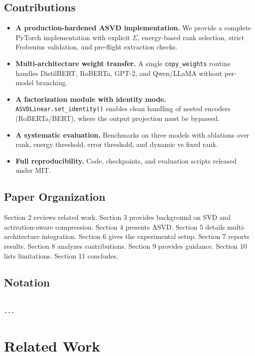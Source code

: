 \subsection{Contributions}

\begin{itemize}
\item \textbf{A production-hardened ASVD implementation.} We provide a complete
  PyTorch implementation with explicit $\Sigma$, energy-based rank selection,
  strict Frobenius validation, and pre-flight extraction checks.
\item \textbf{Multi-architecture weight transfer.} A single \texttt{copy\_weights} routine
  handles DistilBERT, RoBERTa, GPT-2, and Qwen/LLaMA without per-model
  branching.
\item \textbf{A factorization module with identity mode.} \texttt{ASVDLinear.set\_identity()}
  enables clean handling of nested encoders (RoBERTa/BERT), where the output
  projection must be bypassed.
\item \textbf{A systematic evaluation.} Benchmarks on three models with ablations
  over rank, energy threshold, error threshold, and dynamic vs fixed rank.
\item \textbf{Full reproducibility.} Code, checkpoints, and evaluation scripts
  released under MIT.

\end{itemize}
\subsection{Paper Organization}

Section 2 reviews related work. Section 3 provides background on SVD and 
activation-aware compression. Section 4 presents ASVD. Section 5 details 
multi-architecture integration. Section 6 gives the experimental setup. 
Section 7 reports results. Section 8 analyzes contributions. Section 9 
provides guidance. Section 10 lists limitations. Section 11 concludes.



\subsection{Notation}

\begin{lstlisting}

---
\end{lstlisting}


\section{Related Work}

